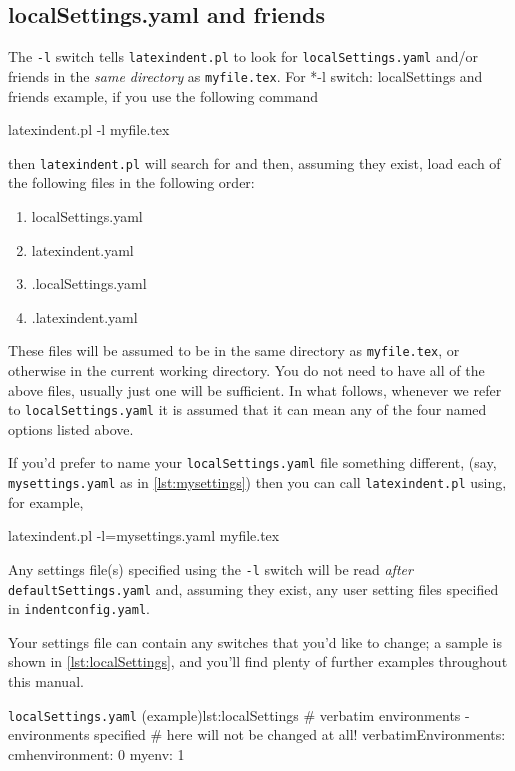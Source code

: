 \subsection{localSettings.yaml and friends}\label{sec:localsettings}
	The \texttt{-l} switch tells \texttt{latexindent.pl} to look for
	\texttt{localSettings.yaml} and/or friends in the \emph{same directory} as
	\texttt{myfile.tex}.  For%
	*{-l switch: localSettings and friends}
	example, if you use the following command
	\begin{commandshell}
latexindent.pl -l myfile.tex
\end{commandshell}
	then \texttt{latexindent.pl} will search for and then, assuming they exist, load each of
	the following files in the following order:
	\begin{enumerate}
		\item localSettings.yaml
		\item latexindent.yaml
		\item .localSettings.yaml
		\item .latexindent.yaml
	\end{enumerate}
	These files will be assumed to be in the same directory as \texttt{myfile.tex}, or
	otherwise in the current working directory. You do not need to have all of the above
	files, usually just one will be sufficient. In what follows, whenever we refer to
	\texttt{localSettings.yaml} it is assumed that it can mean any of the four named options
	listed above.

	If you'd prefer to name your \texttt{localSettings.yaml} file something different, (say,
	\texttt{mysettings.yaml} as in \cref{lst:mysettings}) then you can call
	\texttt{latexindent.pl} using, for example,
	\begin{commandshell}
latexindent.pl -l=mysettings.yaml myfile.tex
\end{commandshell}

	Any settings file(s) specified using the \texttt{-l} switch will be read
	\emph{after} \texttt{defaultSettings.yaml} and, assuming they exist, any user setting
	files specified in \texttt{indentconfig.yaml}.

	Your settings file can contain any switches that you'd like to change; a sample is shown
	in \cref{lst:localSettings}, and you'll find plenty of further examples throughout this
	manual.

	\begin{yaml}{\texttt{localSettings.yaml} (example)}{lst:localSettings}
#  verbatim environments - environments specified
#  here will not be changed at all!
verbatimEnvironments:
    cmhenvironment: 0
    myenv: 1
\end{yaml}

